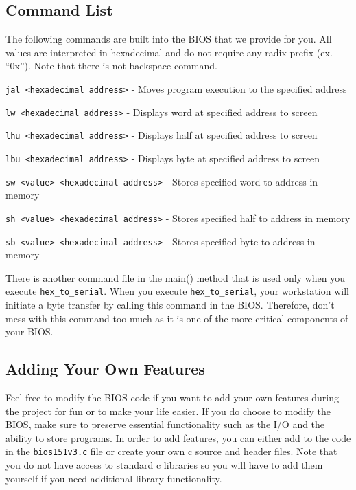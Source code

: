 \documentclass[11pt]{article}
\begin{document}
\subsection{Command List}
The following commands are built into the BIOS that we provide for you. All values are
interpreted in hexadecimal and do not require any radix prefix (ex. ``0x''). Note that there is not
backspace command.

\verb|jal <hexadecimal address>| - Moves program execution to the specified address

\verb|lw <hexadecimal address>| - Displays word at specified address to screen

\verb|lhu <hexadecimal address>| - Displays half at specified address to screen

\verb|lbu <hexadecimal address>| - Displays byte at specified address to screen

\verb|sw <value> <hexadecimal address>| - Stores specified word to address in memory

\verb|sh <value> <hexadecimal address>| - Stores specified half to address in memory

\verb|sb <value> <hexadecimal address>| - Stores specified byte to address in memory

There is another command file in the main() method that is used only when you execute
\verb|hex_to_serial|. When you execute \verb|hex_to_serial|, your workstation will initiate a byte
transfer by calling this command in the BIOS. Therefore, don’t mess with this command too
much as it is one of the more critical components of your BIOS.

\subsection{Adding Your Own Features}
Feel free to modify the BIOS code if you want to add your own features during the project for
fun or to make your life easier. If you do choose to modify the BIOS, make sure to preserve
essential functionality such as the I/O and the ability to store programs. In order to add
features, you can either add to the code in the \verb|bios151v3.c| file or create your own c source and
header files. Note that you do not have access to standard c libraries so you will have to add
them yourself if you need additional library functionality.
\end{document}
